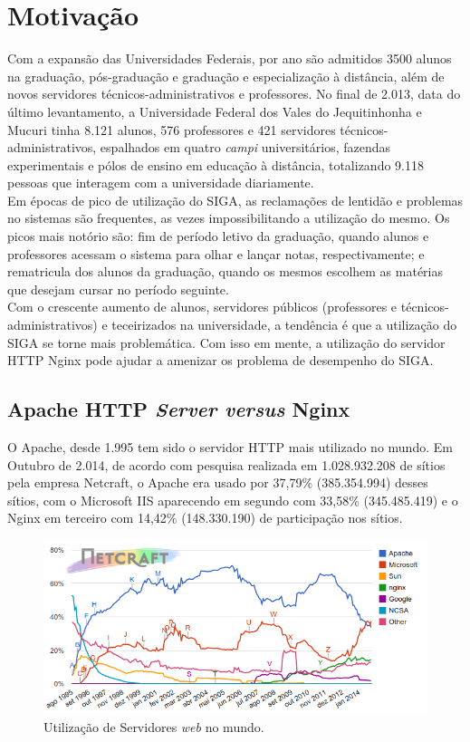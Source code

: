 \section{Motivação}
Com a expansão das Universidades Federais, por ano são admitidos 3500 alunos na graduação, pós-graduação e graduação e especialização à distância, além de novos servidores técnicos-administrativos e professores. No final de 2.013, data do último levantamento, a Universidade Federal dos Vales do Jequitinhonha e Mucuri tinha 8.121 alunos, 576 professores e 421 servidores técnicos-administrativos, espalhados em quatro \textit{campi} universitários, fazendas experimentais e pólos de ensino em educação à distância, totalizando 9.118 pessoas que interagem com a universidade diariamente.\\
Em épocas de pico de utilização do SIGA, as reclamações de lentidão e problemas no sistemas são frequentes, as vezes impossibilitando a utilização do mesmo. Os picos mais notório são: fim de período letivo da graduação, quando alunos e professores acessam o sistema para olhar e lançar notas, respectivamente; e rematricula dos alunos da graduação, quando os mesmos escolhem as matérias que desejam cursar no período seguinte.\\
Com o crescente aumento de alunos, servidores públicos (professores e técnicos-administrativos) e teceirizados na universidade, a tendência é que a utilização do SIGA se torne mais problemática.
Com isso em mente, a utilização do servidor HTTP Nginx pode ajudar a amenizar os problema de desempenho do SIGA.\\

\subsection{Apache HTTP \textit{Server versus} Nginx}
O Apache, desde 1.995 tem sido o servidor HTTP mais utilizado no mundo. Em Outubro de 2.014, de acordo com pesquisa realizada em 1.028.932.208 de sítios pela empresa Netcraft, o Apache era usado por 37,79\% (385.354.994) desses sítios, com o Microsoft IIS aparecendo em segundo com 33,58\% (345.485.419) e o Nginx em terceiro com 14,42\% (148.330.190) de participação nos sítios.\\

\begin{figure}[h!]
	\centering
	\includegraphics[width=0.6\linewidth]{figuras/grafico1}  
	\caption{Utilização de Servidores \textit{web} no mundo.}
	\label{fig:webservers-utilizacao}
\end{figure}


